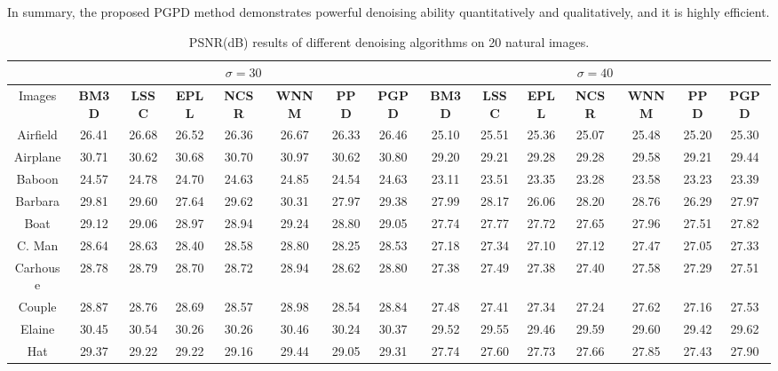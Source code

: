 In summary, the proposed PGPD method demonstrates powerful denoising ability quantitatively and qualitatively, and it is highly efficient.
\vspace{-0.2in}
\begin{table*}[t]
\caption{PSNR(dB) results of different denoising algorithms on 20 natural images.}
\label{tab1}
\begin{center}
\renewcommand\arraystretch{1.0}
\scriptsize
\begin{tabular}{|c||c|c|c|c|c|c|c||c|c|c|c|c|c|c|}
\hline
&\multicolumn{7}{c||}{ $\sigma = 30$}&\multicolumn{7}{c|}{ $\sigma = 40$}
\\
\hline
\hline
Images&\textbf{BM3D}&\textbf{LSSC}&\textbf{EPLL}&\textbf{NCSR}&\textbf{WNNM}&\textbf{PPD}&\textbf{PGPD}
&\textbf{BM3D}&\textbf{LSSC}&\textbf{EPLL}&\textbf{NCSR}&\textbf{WNNM}&\textbf{PPD}&\textbf{PGPD} 
\\
\hline
Airfield& 26.41 & 26.68 & 26.52  &  26.36  & 26.67 &26.33  & 26.46     & 25.10 &  25.51  & 25.36 & 25.07 & 25.48&25.20 & 25.30 
\\
\hline
Airplane&  30.71  & 30.62  &  30.68  &  30.70 & 30.97 &30.62 &  30.80    & 29.20 & 29.21  & 29.28 & 29.28 & 29.58&29.21&29.44
\\
\hline
 Baboon & 24.57   & 24.78  & 24.70   & 24.63  & 24.85&24.54 & 24.63   &  23.11 &  23.51  & 23.35 & 23.28 & 23.58 & 23.23&23.39   
\\
\hline 
 Barbara & 29.81  & 29.60 & 27.64 & 29.62 & 30.31& 27.97 & 29.38   &  27.99 & 28.17 & 26.06 & 28.20 &28.76 & 26.29 & 27.97
\\
\hline
 Boat & 29.12  & 29.06  & 28.97 & 28.94 & 29.24& 28.80 &  29.05   &  27.74& 27.77  &  27.72 & 27.65 &27.96  &27.51 & 27.82    
\\
\hline
 C. Man& 28.64 & 28.63 & 28.40  & 28.58 & 28.80& 28.25& 28.53     & 27.18& 27.34  & 27.10 &27.12  &27.47 & 27.05& 27.33
\\
\hline
 Carhouse& 28.78 & 28.79   & 28.70    & 28.72 & 28.94 &28.62 & 28.80   & 27.38 &  27.49 & 27.38 & 27.40 & 27.58 & 27.29&27.51
\\
\hline
 Couple & 28.87  & 28.76  & 28.69 & 28.57 & 28.98& 28.54 & 28.84    & 27.48 & 27.41 &  27.34  & 27.24 & 27.62 & 27.16 & 27.53   
\\
\hline
 Elaine& 30.45 & 30.54 & 30.26   &  30.26  & 30.46&30.24& 30.37    &29.52 & 29.55 & 29.46 & 29.59 & 29.60&29.42&29.62   
\\
\hline
 Hat& 29.37 & 29.22  & 29.22   &  29.16  & 29.44  & 29.05  &29.31    & 27.74 & 27.60 &  27.73  &  27.66 & 27.85 &27.43&27.90   

\end{tabular}
\end{center}
\end{table*}
